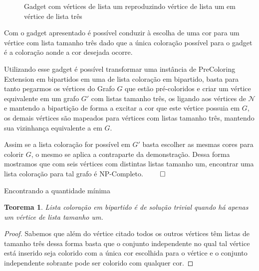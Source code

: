 \documentclass[9pt, compress]{beamer}
\newtheorem{teorema}{Teorema}
\newcommand{\?}{\textcolor{warn}{\textit{?}}}
\begin{document}
    \begin{frame}
   \begin{figure}[H]
      \begin{subfigure}
        \centering
		    
      \end{subfigure}
      \begin{subfigure}
        \centering
		    
      \end{subfigure}
      \begin{subfigure}
        \centering
		    
      \end{subfigure}
      \caption{Gadget com vértices de lista um reproduzindo vértice de lista um em vértice de lista três}
      \label{fig:gadget}
  \end{figure}

      Com o gadget apresentado é possível conduzir à escolha de uma cor para um vértice com lista tamanho três dado que a única coloração possível para o gadget é a coloração aonde a cor desejada ocorre.
    \end{frame}
    \begin{frame}
      Utilizando esse gadget é possível transformar uma instância de PreColoring Extension em bipartidos em uma de lista coloração em bipartido, basta para tanto pegarmos os vértices do Grafo $G$ que estão pré-coloridos e criar um vértice equivalente em um grafo $G'$ com listas tamanho três, os ligando aos vértices de $\mathcal{N}$ e mantendo a bipartição de forma a excitar a cor que este vértice possuia em $G$, os demais vértices são mapeados para vértices com listas tamanho três, mantendo sua vizinhança equivalente a em $G$.

      Assim se a lista coloração for possível em $G'$ basta escolher as mesmas cores para colorir $G$, o mesmo se aplica a contraparte da demonstração. Dessa forma mostramos que com seis vértices com distintas listas tamanho um, encontrar uma lista coloração para tal grafo é NP-Completo. $\qed$
    \end{frame}
     \begin{frame}{Encontrando a quantidade mínima}
       \begin{teorema}
       Lista coloração em bipartido é de solução trivial quando há apenas um vértice de lista tamanho um.
       \end{teorema}
       \begin{proof}
       Sabemos que além do vértice citado todos os outros vértices têm listas de tamanho três dessa forma basta que o conjunto independente no qual tal vértice está inserido seja colorido com a única cor escolhida para o vértice e o conjunto independente sobrante pode ser colorido com qualquer cor.
       \end{proof}
       \end{frame}
\end{document}
